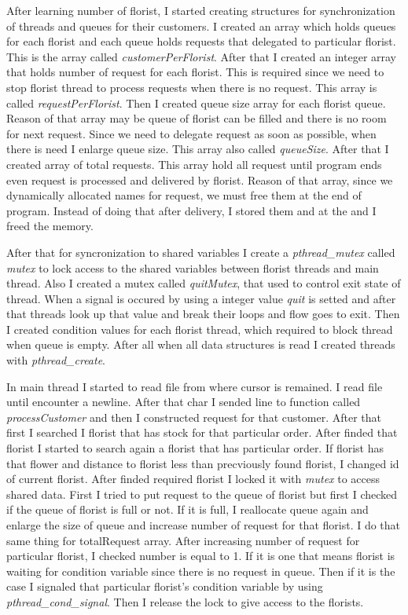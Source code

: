 \documentclass[twocolumn]{article}
\begin{document}
After learning number of florist, I started creating structures for synchronization of threads and queues for their customers. I created an array which holds queues for each florist and each queue holds requests that delegated to particular florist. This is the array called \textit{customerPerFlorist}. After that I created an integer array that holds number of request for each florist. This is required since we need to stop florist thread to process requests when there is no request. This array is called \textit{requestPerFlorist}. Then I created queue size array for each florist queue. Reason of that array may be queue of florist can be filled and there is no room for next request. Since we need to delegate request as soon as possible, when there is need I enlarge queue size. This array also called \textit{queueSize}. After that I created array of total requests. This array hold all request until program ends even request is processed and delivered by florist. Reason of that array, since we dynamically allocated names for request, we must free them at the end of program. Instead of doing that after delivery, I stored them and at the and I freed the memory. 

After that for syncronization to shared variables I create a \textit{pthread\_mutex} called \textit{mutex} to lock access to the shared variables between florist threads and main thread. Also I created a mutex called \textit{quitMutex}, that used to control exit state of thread. When a signal is occured by using a integer value \textit{quit} is setted and after that threads look up that value and break their loops and flow goes to exit. Then I created condition values for each florist thread, which required to block thread when queue is empty. After all when all data structures is read I created threads with \textit{pthread\_create}.

In main thread I started to read file from where cursor is remained. I read file until encounter a newline. After that char I sended line to function called \textit{processCustomer} and then I constructed request for that customer. After that first I searched I florist that has stock for that particular order. After finded that florist I started to search again a florist that has particular order. If florist has that flower and distance to florist less than precviously found florist, I changed id of current florist. After finded required florist I locked it with \textit{mutex} to access shared data. First I tried to put request to the queue of florist but first I checked if the queue of florist is full or not. If it is full, I reallocate queue again and enlarge the size of queue and increase number of request for that florist. I do that same thing for totalRequest array. After increasing number of request for particular florist, I checked number is equal to 1. If it is one that means florist is waiting for condition variable since there is no request in queue. Then if it is the case I signaled that particular florist's condition variable by using \textit{pthread\_cond\_signal}. Then I release the lock to give access to the florists. 
\end{document}
